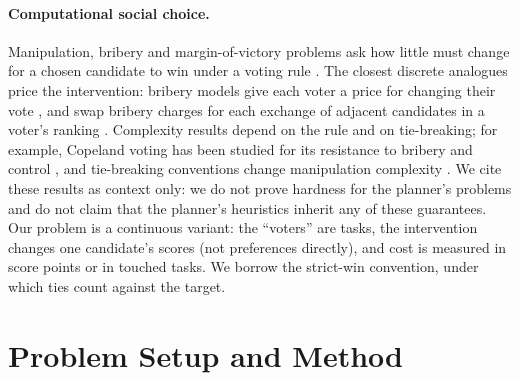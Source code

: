\documentclass{article}
\begin{document}
\paragraph{Computational social choice.} Manipulation, bribery and margin-of-victory problems ask how little must change for a chosen candidate to win under a voting rule \citep{Bartholdi1989TheCD,Faliszewski2006HowHI,Xia2012ComputingTM,Conitzer2016BarriersTM}. The closest discrete analogues price the intervention: bribery models give each voter a price for changing their vote \citep{Faliszewski2006HowHI}, and swap bribery charges for each exchange of adjacent candidates in a voter's ranking \citep{Elkind2009SwapB}. Complexity results depend on the rule and on tie-breaking; for example, Copeland voting has been studied for its resistance to bribery and control \citep{Faliszewski2009LlullAC}, and tie-breaking conventions change manipulation complexity \citep{Obraztsova2011TiesMC}. We cite these results as context only: we do not prove hardness for the planner's problems and do not claim that the planner's heuristics inherit any of these guarantees. Our problem is a continuous variant: the ``voters'' are tasks, the intervention changes one candidate's scores (not preferences directly), and cost is measured in score points or in touched tasks. We borrow the strict-win convention, under which ties count against the target.

\section{Problem Setup and Method}\label{sec:setup}
\end{document}
